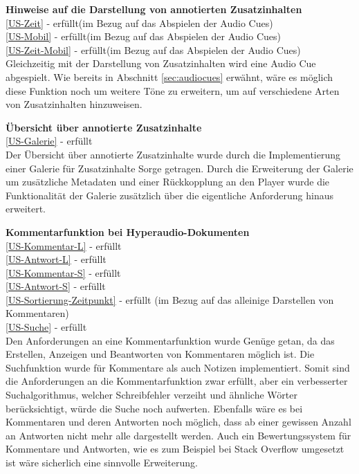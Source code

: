 \textbf{Hinweise auf die Darstellung von annotierten Zusatzinhalten}\\
\ref{US-Zeit} - erfüllt(im Bezug auf das Abspielen der Audio Cues)\\
\ref{US-Mobil} - erfüllt(im Bezug auf das Abspielen der Audio Cues)\\
\ref{US-Zeit-Mobil} - erfüllt(im Bezug auf das Abspielen der Audio Cues)\\
Gleichzeitig mit der Darstellung von Zusatzinhalten wird eine Audio Cue abgespielt. Wie bereits in Abschnitt \ref{sec:audiocues} erwähnt, wäre es möglich diese Funktion noch um weitere Töne zu erweitern, um auf verschiedene Arten von Zusatzinhalten hinzuweisen.

\textbf{Übersicht über annotierte Zusatzinhalte}\\
\ref{US-Galerie} - erfüllt\\
Der Übersicht über annotierte Zusatzinhalte wurde durch die Implementierung einer Galerie für Zusatzinhalte Sorge getragen. Durch die Erweiterung der Galerie um zusätzliche Metadaten und einer Rückkopplung an den Player wurde die Funktionalität der Galerie zusätzlich über die eigentliche Anforderung hinaus erweitert.


\textbf{Kommentarfunktion bei Hyperaudio-Dokumenten}\\
\ref{US-Kommentar-L} - erfüllt\\
\ref{US-Antwort-L} - erfüllt\\
\ref{US-Kommentar-S} - erfüllt\\
\ref{US-Antwort-S} - erfüllt\\
\ref{US-Sortierung-Zeitpunkt} - erfüllt (im Bezug auf das alleinige Darstellen von Kommentaren)\\
\ref{US-Suche} - erfüllt\\
Den Anforderungen an eine Kommentarfunktion wurde Genüge getan, da das Erstellen, Anzeigen und Beantworten von Kommentaren möglich ist. Die Suchfunktion wurde für Kommentare als auch Notizen implementiert. Somit sind die Anforderungen an die Kommentarfunktion zwar erfüllt, aber ein verbesserter Suchalgorithmus, welcher Schreibfehler verzeiht und ähnliche Wörter berücksichtigt, würde die Suche noch aufwerten. Ebenfalls wäre es bei Kommentaren und deren Antworten noch möglich, dass ab einer gewissen Anzahl an Antworten nicht mehr alle dargestellt werden. Auch ein Bewertungssystem für Kommentare und Antworten, wie es zum Beispiel bei Stack Overflow umgesetzt ist wäre sicherlich eine sinnvolle Erweiterung. 



